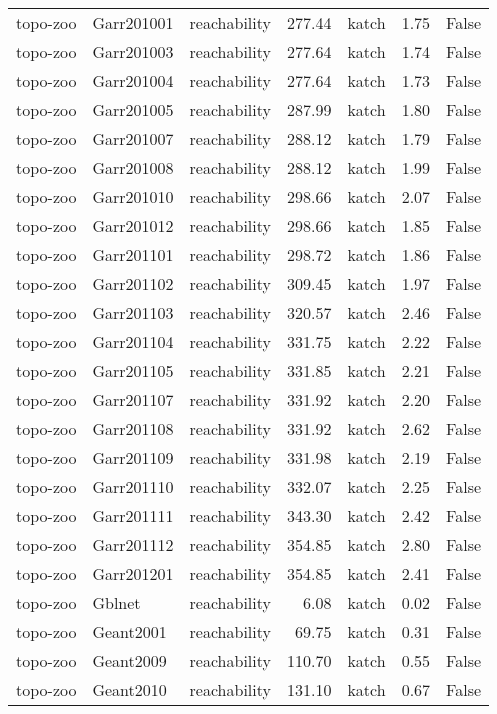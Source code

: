 \begin{tabular}{lllrlrr}
topo-zoo & Garr201001 & reachability & 277.44 & katch & 1.75 & False \\
topo-zoo & Garr201003 & reachability & 277.64 & katch & 1.74 & False \\
topo-zoo & Garr201004 & reachability & 277.64 & katch & 1.73 & False \\
topo-zoo & Garr201005 & reachability & 287.99 & katch & 1.80 & False \\
topo-zoo & Garr201007 & reachability & 288.12 & katch & 1.79 & False \\
topo-zoo & Garr201008 & reachability & 288.12 & katch & 1.99 & False \\
topo-zoo & Garr201010 & reachability & 298.66 & katch & 2.07 & False \\
topo-zoo & Garr201012 & reachability & 298.66 & katch & 1.85 & False \\
topo-zoo & Garr201101 & reachability & 298.72 & katch & 1.86 & False \\
topo-zoo & Garr201102 & reachability & 309.45 & katch & 1.97 & False \\
topo-zoo & Garr201103 & reachability & 320.57 & katch & 2.46 & False \\
topo-zoo & Garr201104 & reachability & 331.75 & katch & 2.22 & False \\
topo-zoo & Garr201105 & reachability & 331.85 & katch & 2.21 & False \\
topo-zoo & Garr201107 & reachability & 331.92 & katch & 2.20 & False \\
topo-zoo & Garr201108 & reachability & 331.92 & katch & 2.62 & False \\
topo-zoo & Garr201109 & reachability & 331.98 & katch & 2.19 & False \\
topo-zoo & Garr201110 & reachability & 332.07 & katch & 2.25 & False \\
topo-zoo & Garr201111 & reachability & 343.30 & katch & 2.42 & False \\
topo-zoo & Garr201112 & reachability & 354.85 & katch & 2.80 & False \\
topo-zoo & Garr201201 & reachability & 354.85 & katch & 2.41 & False \\
topo-zoo & Gblnet & reachability & 6.08 & katch & 0.02 & False \\
topo-zoo & Geant2001 & reachability & 69.75 & katch & 0.31 & False \\
topo-zoo & Geant2009 & reachability & 110.70 & katch & 0.55 & False \\
topo-zoo & Geant2010 & reachability & 131.10 & katch & 0.67 & False \\

\end{tabular}
